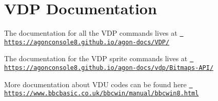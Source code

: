 \chapter{VDP Documentation}
\hypertarget{md_docs_2pages_2vdp}{}\label{md_docs_2pages_2vdp}
\label{md_docs_2pages_2vdp_autotoc_md30}%
%

\begin{DoxyItemize}
\item The documentation for all the VDP commands lives at \href{https://agonconsole8.github.io/agon-docs/VDP/}{\texttt{ https\+://agonconsole8.\+github.\+io/agon-\/docs/\+VDP/}}
\item The documentation for the VDP sprite commands lives at \href{https://agonconsole8.github.io/agon-docs/vdp/Bitmaps-API/}{\texttt{ https\+://agonconsole8.\+github.\+io/agon-\/docs/vdp/\+Bitmaps-\/\+API/}}
\item More documentation about VDU codes can be found here \href{https://www.bbcbasic.co.uk/bbcwin/manual/bbcwin8.html}{\texttt{ https\+://www.\+bbcbasic.\+co.\+uk/bbcwin/manual/bbcwin8.\+html}} 
\end{DoxyItemize}